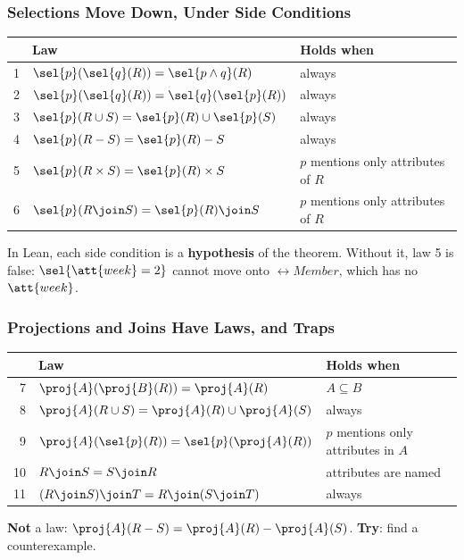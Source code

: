 \begin{frame}
  \frametitle{Selections Move Down, Under Side Conditions}
  {\centering\renewcommand{}
    {\headerrow\begin{tabular}{@{}r@{\quad}l@{\qquad}l@{}}
      \hline
      & \textbf{Law} & \textbf{Holds when} \\ \hline
      1 & $\sel{p}(\sel{q}(R)) = \sel{p \wedge q}(R)$ & always \\
      2 & $\sel{p}(\sel{q}(R)) = \sel{q}(\sel{p}(R))$ & always \\
      3 & $\sel{p}(R \cup S) = \sel{p}(R) \cup \sel{p}(S)$ & always \\
      4 & $\sel{p}(R - S) = \sel{p}(R) - S$ & always \\
      5 & $\sel{p}(R \times S) = \sel{p}(R) \times S$ & $p$ mentions only
        attributes of $R$ \\
      6 & $\sel{p}(R \join S) = \sel{p}(R) \join S$ & $p$ mentions only
        attributes of $R$ \\ \hline
    \end{tabular}}\par}
  \medskip
  In Lean, each side condition is a \textbf{hypothesis} of the theorem.
  Without it, law 5 is false: $\sel{\att{week} = 2}$ cannot move onto
  $\rel{Member}$, which has no $\att{week}$.
\end{frame}

\begin{frame}
  \frametitle{Projections and Joins Have Laws, and Traps}
  {\centering\renewcommand{}
    {\headerrow\begin{tabular}{@{}r@{\quad}l@{\qquad}l@{}}
      \hline
      & \textbf{Law} & \textbf{Holds when} \\ \hline
      7 & $\proj{A}(\proj{B}(R)) = \proj{A}(R)$ & $A \subseteq B$ \\
      8 & $\proj{A}(R \cup S) = \proj{A}(R) \cup \proj{A}(S)$ & always \\
      9 & $\proj{A}(\sel{p}(R)) = \sel{p}(\proj{A}(R))$ & $p$ mentions
        only attributes in $A$ \\
      10 & $R \join S = S \join R$ & attributes are named \\
      11 & $(R \join S) \join T = R \join (S \join T)$ & always \\ \hline
    \end{tabular}}\par}
  \medskip
  \textbf{Not} a law: $\proj{A}(R - S) = \proj{A}(R) - \proj{A}(S)$.
  \textbf{Try}: find a counterexample.
\end{frame}

